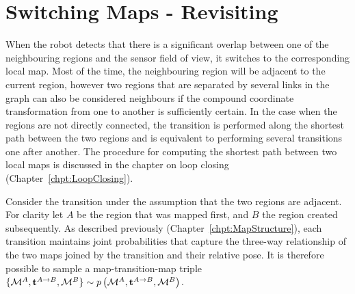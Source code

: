 \section{Switching Maps - Revisiting}
\label{sec:revisiting}

When the robot detects that there is a significant overlap between one
of the neighbouring regions and the sensor field of view, it switches
to the corresponding local map. Most of the time, the neighbouring
region will be adjacent to the current region, however two regions
that are separated by several links in the graph can also be
considered neighbours if the compound coordinate transformation from
one to another is sufficiently certain.  In the case when the regions
are not directly connected, the transition is performed along the
shortest path between the two regions and is equivalent to performing
several transitions one after another. The procedure for computing the
shortest path between two local maps is discussed in the chapter on
loop closing (Chapter~\ref{chpt:LoopClosing}).

Consider the transition under the assumption that the two regions are
adjacent. For clarity let $A$ be the region that was mapped first, and
$B$ the region created subsequently. As described previously
(Chapter~\ref{chpt:MapStructure}), each transition maintains joint
probabilities that capture the three-way relationship of the two maps
joined by the transition and their relative pose. It is therefore
possible to sample a map-transition-map triple $\{
{\mapA,\tr{}{A}{B},\mapB} \} \sim \prob{\mapA,\tr{}{A}{B},\mapB} $.
 

